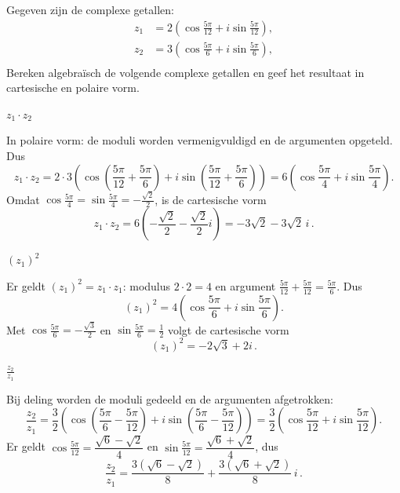 \documentclass{ximera}
\begin{document}
\begin{exercise}
    Gegeven zijn de complexe getallen:
\begin{align*}
    z_1 &= 2 \left(\cos\frac{5\pi}{12} + i \sin\frac{5\pi}{12}\right), \\
    z_2 &= 3 \left(\cos\frac{5\pi}{6}+ i \sin\frac{5\pi}{6}\right), \\
\end{align*}
Bereken algebraïsch de volgende complexe getallen en geef het resultaat in cartesische en polaire vorm.

    \begin{question} $z_1 \cdot z_2$
        \begin{oplossing}\nl
            In polaire vorm: de moduli worden vermenigvuldigd en de argumenten opgeteld. Dus
            \[
                z_1 \cdot z_2
                = 2\cdot 3\left(\cos\left(\frac{5\pi}{12}+\frac{5\pi}{6}\right)
                + i\sin\left(\frac{5\pi}{12}+\frac{5\pi}{6}\right)\right)
                = 6\left(\cos\frac{5\pi}{4}+i\sin\frac{5\pi}{4}\right).
            \]
            Omdat $\cos\frac{5\pi}{4}=\sin\frac{5\pi}{4}=-\frac{\sqrt{2}}{2}$, is de cartesische vorm
            \[
                z_1 \cdot z_2 = 6\left(-\frac{\sqrt{2}}{2}-\frac{\sqrt{2}}{2}i\right)
                = -3\sqrt{2}-3\sqrt{2}\,i\,.
            \]
        \end{oplossing}
    \end{question}
    \begin{question} $(z_1)^2$
        \begin{oplossing}\nl
            Er geldt $(z_1)^2 = z_1\cdot z_1$: modulus $2\cdot 2=4$ en argument $\frac{5\pi}{12}+\frac{5\pi}{12}=\frac{5\pi}{6}$. Dus
            \[
                (z_1)^2 = 4\left(\cos\frac{5\pi}{6}+i\sin\frac{5\pi}{6}\right).
            \]
            Met $\cos\frac{5\pi}{6}=-\frac{\sqrt{3}}{2}$ en $\sin\frac{5\pi}{6}=\frac{1}{2}$ volgt de cartesische vorm
            \[
                (z_1)^2 = -2\sqrt{3}+2i\,.
            \]
        \end{oplossing}
    \end{question}
    \begin{question} $\frac{z_2}{z_1}$
        \begin{oplossing}\nl
            Bij deling worden de moduli gedeeld en de argumenten afgetrokken:
            \[
                \frac{z_2}{z_1}
                = \frac{3}{2}\left(\cos\left(\frac{5\pi}{6}-\frac{5\pi}{12}\right)
                + i\sin\left(\frac{5\pi}{6}-\frac{5\pi}{12}\right)\right)
                = \frac{3}{2}\left(\cos\frac{5\pi}{12}+i\sin\frac{5\pi}{12}\right).
            \]
            Er geldt $\cos\frac{5\pi}{12}=\dfrac{\sqrt{6}-\sqrt{2}}{4}$ en $\sin\frac{5\pi}{12}=\dfrac{\sqrt{6}+\sqrt{2}}{4}$, dus
            \[
                \frac{z_2}{z_1}
                = \frac{3(\sqrt{6}-\sqrt{2})}{8}+\frac{3(\sqrt{6}+\sqrt{2})}{8}\,i\,.
            \]
        \end{oplossing}
    \end{question}
  
\end{exercise}
\end{document}
